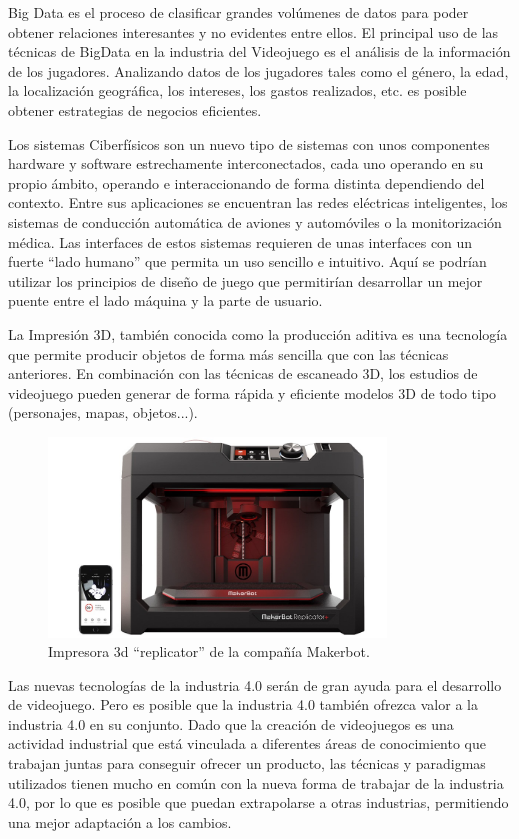 Big Data es el proceso de clasificar grandes volúmenes de datos para poder obtener relaciones interesantes y no evidentes entre ellos. El principal uso de las técnicas de BigData en la industria del Videojuego es el análisis de la información de los jugadores. Analizando datos de los jugadores tales como el género, la edad, la localización geográfica, los intereses, los gastos realizados, etc. es posible obtener estrategias de negocios eficientes.

Los sistemas Ciberfísicos son un nuevo tipo de sistemas con unos componentes hardware y software estrechamente interconectados, cada uno operando en su propio ámbito, operando e interaccionando de forma distinta dependiendo del contexto\cite{cyber_physics}. Entre sus aplicaciones se encuentran las redes eléctricas inteligentes, los sistemas de conducción automática de aviones y automóviles o la monitorización médica. Las interfaces de estos sistemas requieren de unas interfaces con un fuerte ``lado humano'' que permita un uso sencillo e intuitivo. Aquí se podrían utilizar los principios de diseño de juego que permitirían desarrollar un mejor puente entre el lado máquina y la parte de usuario.

La Impresión 3D, también conocida como la producción aditiva es una tecnología que permite producir objetos de forma más sencilla que con las técnicas anteriores. En combinación con las técnicas de escaneado 3D, los estudios de videojuego pueden generar de forma rápida y eficiente modelos 3D de todo tipo (personajes, mapas, objetos...).

\begin{figure}[h]
    \centering
    \includegraphics[width=0.8\textwidth]{images/estadodelarte/mercado/impresion-3d}
    \caption{Impresora 3d ``replicator'' de la compañía Makerbot.}
\end{figure}

Las nuevas tecnologías de la industria 4.0 serán de gran ayuda para el desarrollo de videojuego. Pero es posible que la industria 4.0 también ofrezca valor a la industria 4.0 en su conjunto. Dado que la creación de videojuegos es una actividad industrial que está vinculada a diferentes áreas de conocimiento que trabajan juntas para conseguir ofrecer un producto, las técnicas y paradigmas utilizados tienen mucho en común con la nueva forma de trabajar de la industria 4.0, por lo que es posible que puedan extrapolarse a otras industrias, permitiendo una mejor adaptación a los cambios.
